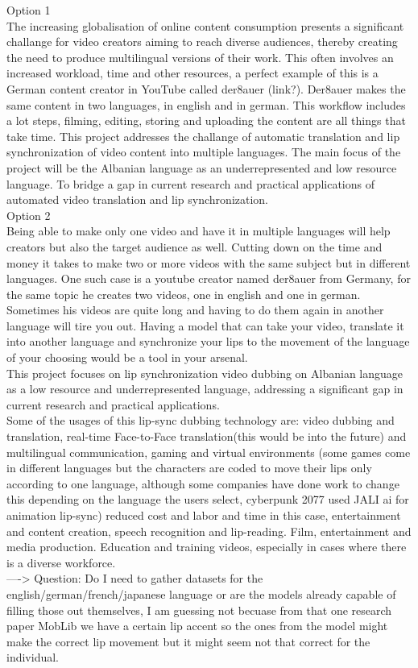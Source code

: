 \documentclass[12pt]{article}
\begin{document}
Option 1\\
The increasing globalisation of online content consumption presents a significant challange for video creators aiming to reach diverse audiences, thereby creating the need to produce multilingual versions of their work. This often involves an increased workload, time and other resources, a perfect example of this is a German content creator in YouTube called der8auer (link?). Der8auer makes the same content in two languages, in english and in german. This workflow includes a lot steps, filming, editing, storing and uploading the content are all things that take time. This project addresses the challange of automatic translation and lip synchronization of video content into multiple languages. 
The main focus of the project will be the Albanian language as an underrepresented and low resource language. To bridge a gap in current research and practical applications of automated video translation and lip synchronization.\\
Option 2\\
Being able to make only one video and have it in multiple languages will help creators but also the target audience as well. Cutting down on the time and money it takes to make two or more videos with the same subject but in different languages. One such case is a youtube creator named der8auer from Germany, for the same topic he creates two videos, one in english and one in german. Sometimes his videos are quite long and having to do them again in another language will tire you out. Having a model that can take your video, translate it into another language and synchronize your lips to the movement of the language of your choosing would be a tool in your arsenal.\\
This project focuses on lip synchronization video dubbing on Albanian language as a low resource and underrepresented language, addressing a significant gap in current research and practical applications.\\
Some of the usages of this lip-sync dubbing technology are: video dubbing and translation, real-time Face-to-Face translation(this would be into the future) and multilingual communication, gaming and virtual environments (some games come in different languages but the characters are coded to move their lips only according to one language, although some companies have done work to change this depending on the language the users select, cyberpunk 2077 used JALI ai for animation lip-sync) reduced cost and labor and time in this case, entertainment and content creation, speech recognition and lip-reading. Film, entertainment and media production. Education and training videos, especially in cases where there is a diverse workforce. \\
----> Question: Do I need to gather datasets for the english/german/french/japanese language or are the models already capable of filling those out themselves, I am guessing not becuase from that one research paper MobLib we have a certain lip accent so the ones from the model might make the correct lip movement but it might seem not that correct for the individual.
\\
\end{document}
